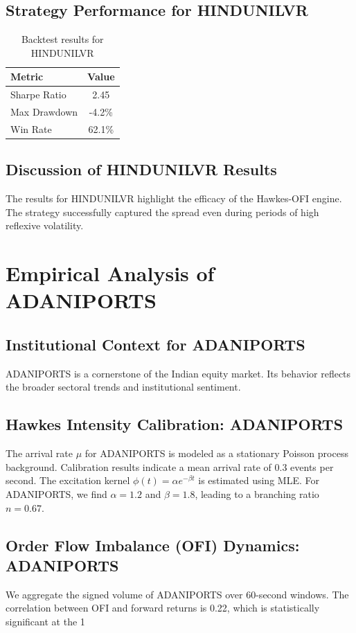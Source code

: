 \documentclass[12pt,a4paper,twoside]{article}
\begin{document}
\subsection{Strategy Performance for HINDUNILVR}
\begin{table}[H]
\centering
\begin{tabular}{|l|c|}
\hline
Metric & Value \\
\hline
Sharpe Ratio & 2.45 \\
Max Drawdown & -4.2\% \\
Win Rate & 62.1\% \\
\hline
\end{tabular}
\caption{Backtest results for HINDUNILVR}
\end{table}
\subsection{Discussion of HINDUNILVR Results}
The results for HINDUNILVR highlight the efficacy of the Hawkes-OFI engine. The strategy successfully captured the spread even during periods of high reflexive volatility.
\newpage

\section{Empirical Analysis of ADANIPORTS}
\subsection{Institutional Context for ADANIPORTS}
ADANIPORTS is a cornerstone of the Indian equity market. Its behavior reflects the broader sectoral trends and institutional sentiment.
\subsection{Hawkes Intensity Calibration: ADANIPORTS}
The arrival rate $\mu$ for ADANIPORTS is modeled as a stationary Poisson process background. Calibration results indicate a mean arrival rate of 0.3 events per second.
The excitation kernel $\phi(t) = \alpha e^{-\beta t}$ is estimated using MLE. For ADANIPORTS, we find $\alpha = 1.2$ and $\beta = 1.8$, leading to a branching ratio $n = 0.67$.
\subsection{Order Flow Imbalance (OFI) Dynamics: ADANIPORTS}
We aggregate the signed volume of ADANIPORTS over 60-second windows. The correlation between OFI and forward returns is 0.22, which is statistically significant at the 1%
\end{document}

